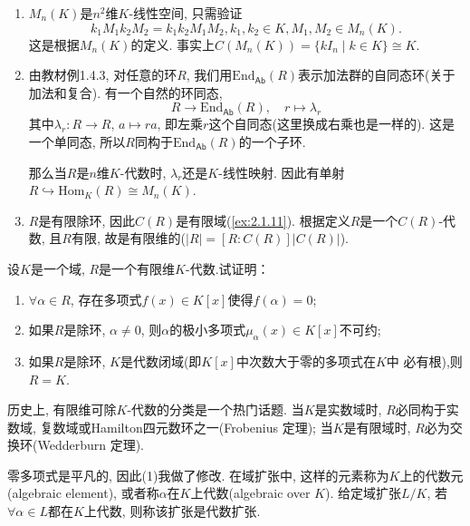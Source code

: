 \begin{solution}
    \begin{enumerate}[(1)]
        \item $M_n(K)$是$n^2$维$K$-线性空间, 只需验证
        \[
            k_1M_1k_2M_2 = k_1k_2M_1M_2, k_1, k_2 \in K, M_1, M_2 \in M_n(K).
        \]
        这是根据$M_n(K)$的定义. 事实上$C(M_n(K)) = \{kI_n \mid k \in K\} \cong K$.
        \item 由教材例1.4.3, 对任意的环$R$, 我们用$\mathrm{End}_{\mathsf{Ab}}(R)$表示加法群的自同态环(关于加法和复合). 有一个自然的环同态,
        \[
            R \to \mathrm{End}_{\mathsf{Ab}}(R),\quad r \mapsto \lambda_r
        \]
        其中$\lambda_r: R \to R,\, a \mapsto ra$, 即左乘$r$这个自同态(这里换成右乘也是一样的). 这是一个单同态, 所以$R$同构于$\mathrm{End}_{\mathsf{Ab}}(R)$的一个子环.

        那么当$R$是$n$维$K$-代数时, $\lambda_r$还是$K$-线性映射. 因此有单射$R \hookrightarrow \mathrm{Hom}_K(R) \cong M_n(K)$.
        \item $R$是有限除环, 因此$C(R)$是有限域(\ref{ex:2.1.11}). 根据定义$R$是一个$C(R)$-代数, 且$R$有限, 故是有限维的($|R| = [R:C(R)]|C(R)|$).
    \end{enumerate}
\end{solution}

\begin{problem}
    设$K$是一个域, $R$是一个有限维$K$-代数.试证明：
\begin{enumerate}[(1)]
    \item $\forall \alpha \in R$, 存在多项式$f(x) \in K[x]$使得$f(\alpha) = 0$;
    \item 如果$R$是除环, $\alpha \neq 0$, 则$\alpha$的极小多项式$\mu_\alpha(x) \in K[x]$不可约;
    \item 如果$R$是除环, $K$是代数闭域(即$K[x]$中次数大于零的多项式在$K$中
必有根),则$R = K$.
\end{enumerate}
历史上, 有限维可除$K$-代数的分类是一个热门话题. 当$K$是实数域时, $R$必同构于实数域,
复数域或Hamilton四元数环之一(Frobenius 定理);
当$K$是有限域时, $R$必为交换环(Wedderburn 定理).
\end{problem}

零多项式是平凡的, 因此(1)我做了修改. 在域扩张中, 这样的元素称为$K$上的代数元(algebraic element), 或者称$\alpha$在$K$上代数(algebraic over $K$). 给定域扩张$L/K$, 若$\forall \alpha \in L$都在$K$上代数, 则称该扩张是代数扩张.

